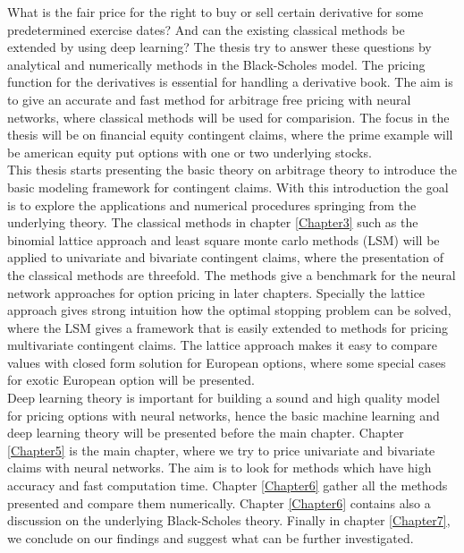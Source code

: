 What is the fair price for the right to buy or sell certain derivative for some predetermined exercise dates? And can the existing classical methods be extended by using deep learning? The thesis try to answer these questions by analytical and numerically methods in the Black-Scholes model. The pricing function for the derivatives is essential for handling a derivative book. The aim is to give an accurate and fast method for arbitrage free pricing with neural networks, where classical methods will be used for comparision. The focus in the thesis will be on financial equity contingent claims, where the prime example will be american equity put options with one or two underlying stocks.\\

This thesis starts presenting the basic theory on arbitrage theory to introduce the basic modeling framework for contingent claims. With this introduction the goal is to explore the applications and numerical procedures springing from the underlying theory. The classical methods in chapter \ref{Chapter3} such as the binomial lattice approach and least square monte carlo methods (LSM) will be applied to univariate and bivariate contingent claims, where the presentation of the classical methods are threefold. The methods give a benchmark for the neural network approaches for option pricing in later chapters. Specially the lattice approach gives strong intuition how the optimal stopping problem can be solved, where the LSM gives a framework that is easily extended to methods for pricing multivariate contingent claims. The lattice approach makes it easy to compare values with closed form solution for European options, where some special cases for exotic European option will be presented. \\

Deep learning theory is important for building a sound and high quality model for pricing options with neural networks, hence the basic machine learning and deep learning theory will be presented before the main chapter. Chapter \ref{Chapter5} is the main chapter, where we try to price univariate and bivariate claims with neural networks. The aim is to look for methods which have high accuracy and fast computation time. Chapter \ref{Chapter6} gather all the methods presented and compare them numerically. Chapter \ref{Chapter6} contains also a discussion on the underlying Black-Scholes theory. Finally in chapter \ref{Chapter7}, we conclude on our findings and suggest what can be further investigated.


